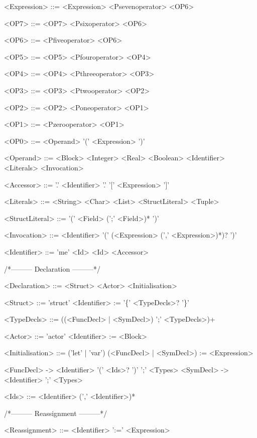 \begin{grammar}
<Expression> ::= <Expression> <Psevenoperator> <OP6>

<OP7> ::= <OP7> <Psixoperator> <OP6>

<OP6> ::= <Pfiveoperator> <OP6>

<OP5> ::= <OP5> <Pfouroperator> <OP4>

<OP4> ::= <OP4> <Pthreeoperator> <OP3>

<OP3> ::= <OP3> <Ptwooperator> <OP2>

<OP2> ::= <OP2> <Poneoperator> <OP1>

<OP1> ::= <Pzerooperator> <OP1>

<OP0> ::= <Operand>
 \alt '(' <Expression> ')'

<Operand> ::= <Block>
 \alt <Integer>
 \alt <Real>
 \alt <Boolean>
 \alt <Identifier>
 \alt <Literals>
 \alt <Invocation>

<Accessor> ::= '.' <Identifier>
 \alt '.' '[' <Expression> ']'

<Literals> ::= <String>
 \alt <Char>
 \alt <List>
 \alt <StructLiteral>
 \alt <Tuple>

<StructLiteral> ::= '(' <Field> (';' <Field>)* ')'

<Invocation> ::= <Identifier> '(' (<Expression> (',' <Expression>)*)? ')'

<Identifier> ::= 'me'
 \alt <Id>
 \alt <Id> <Accessor>

\end{grammar}
/*--------- Declaration ---------*/
\begin{grammar}
<Declaration> ::= <Struct>
 \alt <Actor>
 \alt <Initialisation>

<Struct> ::= 'struct' <Identifier> := '\{' <TypeDecls>? '\}'

<TypeDecls> ::= ((<FuncDecl> | <SymDecl>) ';' <TypeDecls>)+

<Actor> ::= 'actor' <Identifier> := <Block>

<Initialisation> ::= ('let' | 'var') (<FuncDecl> | <SymDecl>) := <Expression>

<FuncDecl> -> <Identifier> '(' <Ids>? ')' ';' <Types>
<SymDecl> -> <Identifier> ';' <Types>

<Ids> ::= <Identifier> (',' <Identifier>)*

\end{grammar}
/*--------- Reassignment ---------*/
\begin{grammar}
<Reassignment> ::= <Identifier> ':=' <Expression>
\end{grammar}
